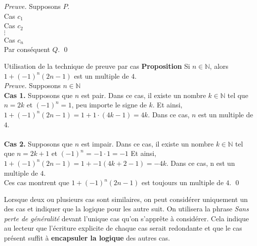 \documentclass[16pt]{report}
\begin{document}
\begin{multicols*}{2}
\begin{center}
{{                    \vspace{0.5em} %
                    \noindent \textit{Preuve.} \quad Supposons \( P \). \\

                    Cas $c_1$ \\ 
                    Cas $c_2$ \\ 
                    \hspace{1em} \(\vdots\) \\ %
                    Cas $c_n$ \\

                    \vspace{0.5em} %
                    \noindent Par conséquent \( Q \). \qed
                }%
            }
            \end{center}


            \begin{Preuve}{Utilisation de la technique de preuve par cas}{}
                \textbf{Proposition} \quad Si $n \in \mathbb{N}$, alors $1+(-1)^n(2n-1)$ est un multiple de $4$.
                \vspace{1em} \\
                \textit{Preuve.} \quad Supposons $n \in \mathbb{N}$\\   
                \textbf{Cas 1.} \quad Supposons que $n$ est pair. Dans ce cas, il existe un nombre 
                $k \in \mathbb{N}$ tel que $n = 2k $ et $(-1)^n = 1$, peu importe le signe de $k$. Et ainsi, 
                $1 + (-1)^n(2n-1) = 1 + 1\cdot(4k -1) = 4k$. Dans ce cas, $n$ est un multiple de $4$. 
                \\\\
                \textbf{Cas 2.} Supposons que $n$ est impair. Dans ce cas, il existe un nombre 
                $k \in \mathbb{N}$ tel que $n = 2k + 1$ et $(-1)^n$ = $ -1 \cdot 1 = -1$ Et ainsi,
                $1 + (-1)^n(2n -1) = 1 + -1(4k + 2 -1) = -4k$. Dans ce cas, n est un multiple de $4$. \\
                Ces cas montrent que  $1 + (-1)^n(2n -1)$ est toujours un multiple de $4$. \qed   
            \end{Preuve}


            Lorsque deux ou plusieurs cas sont similaires, on peut considérer uniquement un des cas 
            et indiquer que la logique pour les autre suit. On utilisera la phrase \textit{Sans perte de généralité}
            devant l'unique cas qu'on s'apprête à considérer. Cela indique au lecteur que l'écriture explicite de 
            chaque cas serait redondante et que le cas présent suffit à \textbf{encapsuler la logique} des autres cas.   



\end{multicols*}
\end{document}
